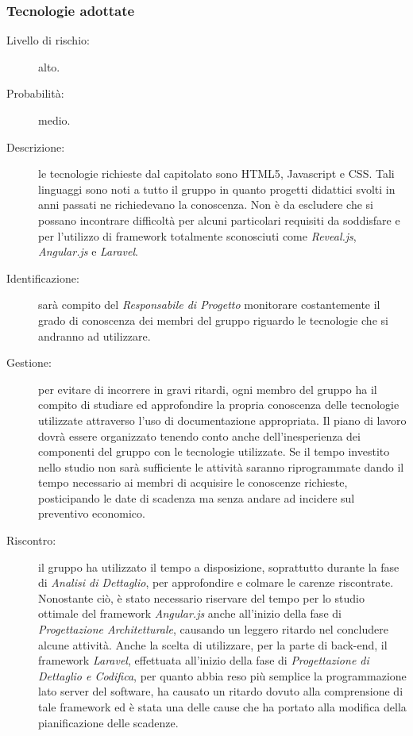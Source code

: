 \subsubsection{Tecnologie adottate}
\begin{description}
	\item[Livello di rischio:] alto.
	\item[Probabilità:] medio.
	\item[Descrizione:] le tecnologie richieste dal capitolato sono \gls{HTML5}, \gls{Javascript} e \gls{CSS}. Tali linguaggi sono noti a tutto il gruppo in quanto progetti didattici svolti in anni passati ne richiedevano la conoscenza. Non è da escludere che si possano incontrare difficoltà per alcuni particolari requisiti da soddisfare e per l'utilizzo di \gls{framework} totalmente sconosciuti come \textit{\gls{Reveal.js}}, \textit{\gls{Angular.js}} e \textit{\gls{Laravel}}.
	\item[Identificazione:] sarà compito del \textit{Responsabile di Progetto} monitorare costantemente il grado di conoscenza dei membri del gruppo riguardo le tecnologie che si andranno ad utilizzare.
	\item[Gestione:] per evitare di incorrere in gravi ritardi, ogni membro del gruppo ha il compito di studiare ed approfondire la propria conoscenza delle tecnologie utilizzate attraverso l'uso di documentazione appropriata. Il piano di lavoro dovrà essere organizzato tenendo conto anche dell'inesperienza dei componenti del gruppo con le tecnologie utilizzate. Se il tempo investito nello studio non sarà sufficiente le attività saranno riprogrammate dando il tempo necessario ai membri di acquisire le conoscenze richieste, posticipando le date di scadenza ma senza andare ad incidere sul preventivo economico.
	\item[Riscontro:] il gruppo ha utilizzato il tempo a disposizione, soprattutto durante la fase di \textit{Analisi di Dettaglio}, per approfondire e colmare le carenze riscontrate. Nonostante ciò, è stato necessario riservare del tempo per lo studio ottimale del \gls{framework} \textit{\gls{Angular.js}} anche all'inizio della fase di \textit{Progettazione Architetturale}, causando un leggero ritardo nel concludere alcune attività. Anche la scelta di utilizzare, per la parte di \gls{back-end}, il \gls{framework} \textit{\gls{Laravel}}, effettuata all'inizio della fase di \textit{Progettazione di Dettaglio e Codifica}, per quanto abbia reso più semplice la programmazione lato server del software, ha causato un ritardo dovuto alla comprensione di tale \gls{framework} ed è stata una delle cause che ha portato alla modifica della pianificazione delle scadenze.
\end{description}
